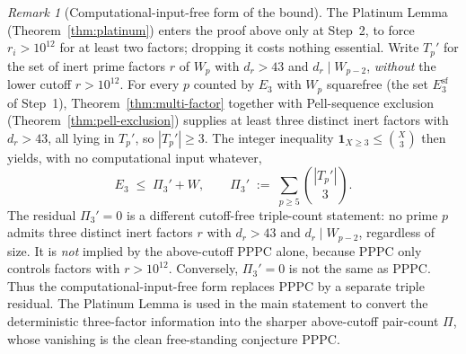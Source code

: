 \documentclass[11pt]{amsart}
\theoremstyle{plain}
\theoremstyle{definition}
\theoremstyle{remark}
\newtheorem{remark}[theorem]{Remark}
\numberwithin{equation}{section}
\begin{document}
\begin{remark}[Computational-input-free form of the bound]\label{rem:input-free}
The Platinum Lemma (Theorem~\ref{thm:platinum}) enters the proof above only at Step~2, to force $r_i > 10^{12}$ for at least two factors; dropping it costs nothing essential. Write $T_p'$ for the set of inert prime factors $r$ of $W_p$ with $d_r > 43$ and $d_r \mid W_{p-2}$, \emph{without} the lower cutoff $r > 10^{12}$. For every $p$ counted by $E_3$ with $W_p$ squarefree (the set $E_3^{\mathrm{sf}}$ of Step~1), Theorem~\ref{thm:multi-factor} together with Pell-sequence exclusion (Theorem~\ref{thm:pell-exclusion}) supplies at least three distinct inert factors with $d_r > 43$, all lying in $T_p'$, so $|T_p'| \geq 3$. The integer inequality $\mathbf{1}_{X \geq 3} \leq \binom{X}{3}$ then yields, with no computational input whatever,
\[
  E_3 \;\leq\; \Pi_3' + W, \qquad \Pi_3' \;:=\; \sum_{p \geq 5} \binom{|T_p'|}{3}.
\]
The residual $\Pi_3' = 0$ is a different cutoff-free triple-count statement: no prime $p$ admits three distinct inert factors $r$ with $d_r > 43$ and $d_r \mid W_{p-2}$, regardless of size. It is \emph{not} implied by the above-cutoff PPPC alone, because PPPC only controls factors with $r>10^{12}$. Conversely, $\Pi_3'=0$ is not the same as PPPC. Thus the computational-input-free form replaces PPPC by a separate triple residual. The Platinum Lemma is used in the main statement to convert the deterministic three-factor information into the sharper above-cutoff pair-count $\Pi$, whose vanishing is the clean free-standing conjecture PPPC.
\end{remark}
\end{document}
